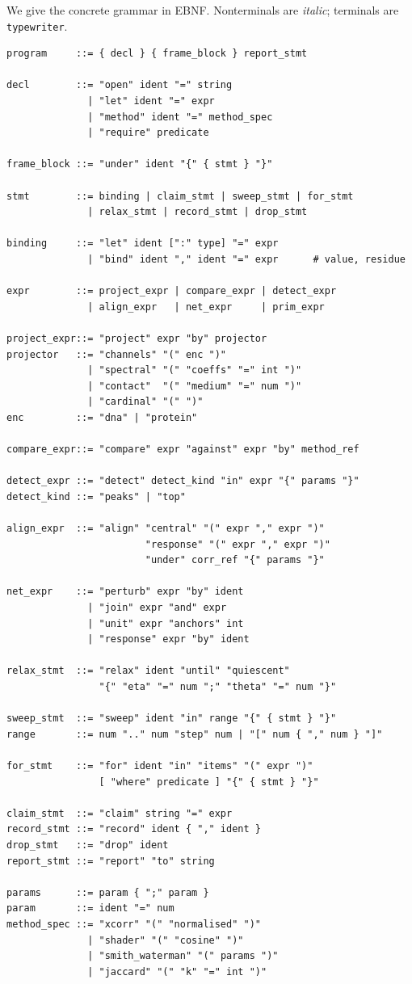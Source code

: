 \documentclass[11pt,twocolumn,a4paper]{article}
\theoremstyle{plain}
\theoremstyle{definition}
\theoremstyle{remark}
\begin{document}
We give the concrete grammar in EBNF. Nonterminals are
\textit{italic}; terminals are \texttt{typewriter}.

\begin{lstlisting}[style=grammar]
program     ::= { decl } { frame_block } report_stmt

decl        ::= "open" ident "=" string
              | "let" ident "=" expr
              | "method" ident "=" method_spec
              | "require" predicate

frame_block ::= "under" ident "{" { stmt } "}"

stmt        ::= binding | claim_stmt | sweep_stmt | for_stmt
              | relax_stmt | record_stmt | drop_stmt

binding     ::= "let" ident [":" type] "=" expr
              | "bind" ident "," ident "=" expr      # value, residue

expr        ::= project_expr | compare_expr | detect_expr
              | align_expr   | net_expr     | prim_expr

project_expr::= "project" expr "by" projector
projector   ::= "channels" "(" enc ")"
              | "spectral" "(" "coeffs" "=" int ")"
              | "contact"  "(" "medium" "=" num ")"
              | "cardinal" "(" ")"
enc         ::= "dna" | "protein"

compare_expr::= "compare" expr "against" expr "by" method_ref

detect_expr ::= "detect" detect_kind "in" expr "{" params "}"
detect_kind ::= "peaks" | "top"

align_expr  ::= "align" "central" "(" expr "," expr ")"
                        "response" "(" expr "," expr ")"
                        "under" corr_ref "{" params "}"

net_expr    ::= "perturb" expr "by" ident
              | "join" expr "and" expr
              | "unit" expr "anchors" int
              | "response" expr "by" ident

relax_stmt  ::= "relax" ident "until" "quiescent"
                "{" "eta" "=" num ";" "theta" "=" num "}"

sweep_stmt  ::= "sweep" ident "in" range "{" { stmt } "}"
range       ::= num ".." num "step" num | "[" num { "," num } "]"

for_stmt    ::= "for" ident "in" "items" "(" expr ")"
                [ "where" predicate ] "{" { stmt } "}"

claim_stmt  ::= "claim" string "=" expr
record_stmt ::= "record" ident { "," ident }
drop_stmt   ::= "drop" ident
report_stmt ::= "report" "to" string

params      ::= param { ";" param }
param       ::= ident "=" num
method_spec ::= "xcorr" "(" "normalised" ")"
              | "shader" "(" "cosine" ")"
              | "smith_waterman" "(" params ")"
              | "jaccard" "(" "k" "=" int ")"
\end{lstlisting}
\end{document}
